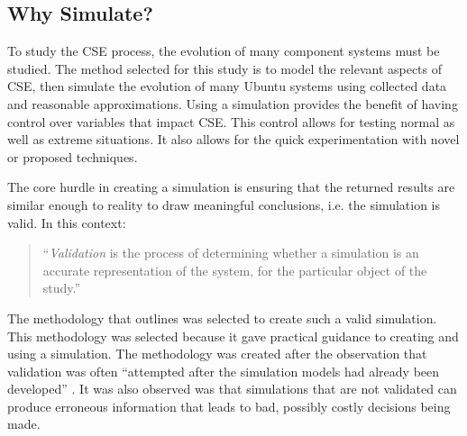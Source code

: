 \subsection{Why Simulate?}
To study the CSE process, the evolution of many component systems must be studied.
The method selected for this study is to model the relevant aspects of CSE, then simulate the evolution of many Ubuntu systems using collected data and reasonable approximations.
Using a simulation provides the benefit of having control over variables that impact CSE.
This control allows for testing normal as well as extreme situations.
It also allows for the quick experimentation with novel or proposed techniques.

The core hurdle in creating a simulation is ensuring that the returned results are similar enough to reality to draw meaningful conclusions, i.e. the simulation is valid.
In this context:
\begin{quotation}
``\textit{Validation} is the process of determining whether a simulation is an accurate representation of the system, for the particular object of the study.'' \citep{Law2005}
\end{quotation}

The methodology that \cite{Law2005} outlines was selected to create such a valid simulation.
This methodology was selected because it gave practical guidance to creating and using a simulation.
The methodology was created after the observation that validation was often ``attempted after the simulation models had already been developed'' \citep{Law2005}.
It was also observed was that simulations that are not validated can produce erroneous information that leads to bad, possibly costly decisions being made.

